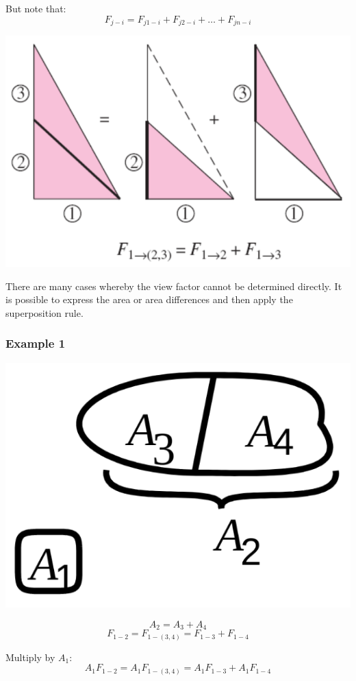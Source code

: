\documentclass[11pt]{article}
\begin{document}
But note that:
\[F_{j-i} = F_{j1-i} + F_{j2-i} + \ldots + F_{jn-i}\]

\begin{center}
\includegraphics[width=.9\linewidth]{./images/superposition-rule-diagram.png}
\end{center}

There are many cases whereby the view factor cannot be determined directly. It is possible to express the area or area differences and then apply the superposition rule.
\subsubsection{Example 1}
\label{sec:orgb0b37f2}
\begin{center}
\includegraphics[width=.9\linewidth]{./images/superposition-rule-example-1-diagram.png}
\end{center}
\[A_2 = A_3 + A_4\]
\[F_{1-2} = F_{1-(3, 4)} = F_{1-3} + F_{1-4}\]

Multiply by \(A_1\):
\[A_1 F_{1-2} = A_1 F_{1-(3, 4)} = A_1 F_{1-3} + A_1 F_{1-4}\]
\end{document}
